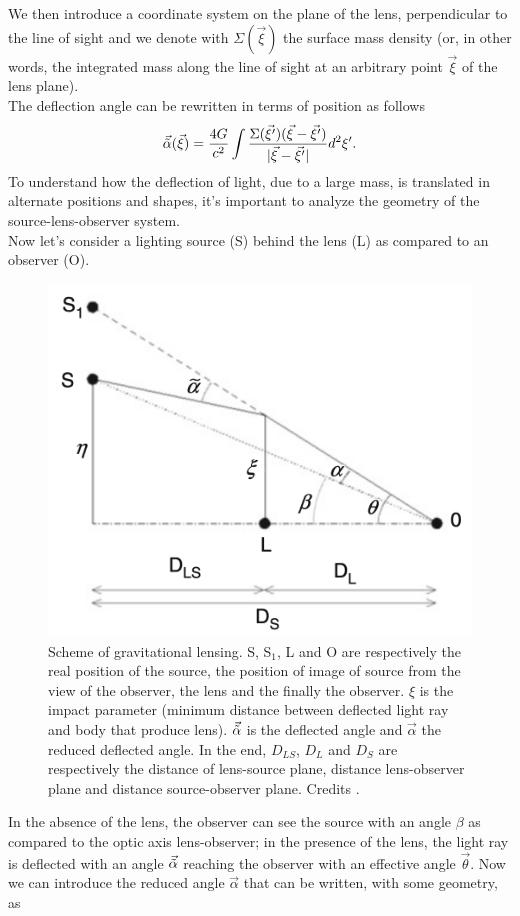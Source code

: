 We then introduce a coordinate system on the plane of the lens, perpendicular to the line of sight and we denote with $\Sigma(\vec{\xi})$ the surface mass density (or, in other words, the integrated mass along the line of sight at an arbitrary point $\vec{\xi}$ of the lens plane).\\
The deflection angle can be rewritten in terms of position as follows
\begin{equation}
    \vec{\Tilde{\alpha}} (\vec{\xi}) = \frac{4G}{c^2} \int \frac{\Sigma (\vec{\xi'})(\vec{\xi} - \vec{\xi'})}{|\vec{\xi} - \vec{\xi'}|} d^2 \xi '.
\end{equation}
To understand how the deflection of light, due to a large mass, is translated in alternate positions and shapes, it's important to analyze the geometry of the source-lens-observer system.\\
Now let's consider a lighting source (S) behind the lens (L) as compared to an observer (O).\\
\begin{figure}[h!]
\centering
    \includegraphics[width=0.50\linewidth]{Images/Chapter3/Lensing schema.png}
    \caption[Scheme of gravitational lensing]{Scheme of gravitational lensing. S, S$_1$, L and O are respectively the real position of the source, the position of image of source from the view of the observer, the lens and the finally the observer. $\xi$ is the impact parameter (minimum distance between deflected light ray and body that produce lens). $\vec{\Tilde{\alpha}}$ is the deflected angle and $\vec\alpha$ the reduced deflected angle. In the end, $D_{LS}$, $D_L$ and $D_S$ are respectively the distance of lens-source plane, distance lens-observer plane and distance source-observer plane. Credits \cite{Longair}.}
\label{Scheme of gravitational lensing}
\end{figure}In the absence of the lens, the observer can see the source with an angle $\beta$ as compared to the optic axis lens-observer; in the presence of the lens, the light ray is deflected with an angle $\vec{\Tilde{\alpha}}$ reaching the observer with an effective angle $\vec{\theta}$. Now we can introduce the reduced angle $\vec{\alpha}$ that can be written, with some geometry, as
